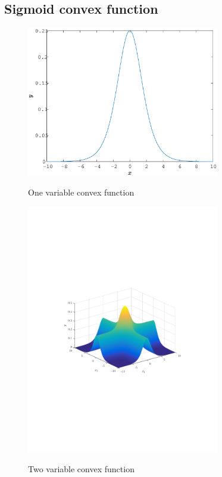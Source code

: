 \documentclass[letterpaper, 12pt]{article}
\begin{document}
	\subsection{Sigmoid convex function}
	\begin{figure}
		\centering
		\includegraphics[width=0.75\textwidth]{Matlab/1FactorsSigmoid}
		\label{Fig:OneVarSigmoid}
		\caption{One variable convex function}
	\end{figure}
	\begin{figure}
		\centering
		\includegraphics[width=0.75\textwidth]{Matlab/2FactorsSigmoid}
		\label{Fig:MultiVarSigmoid}
		\caption{Two variable convex function}
	\end{figure}
\end{document}

